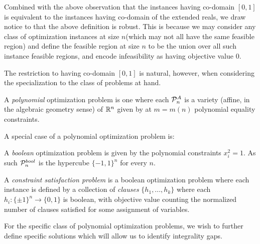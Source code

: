 \documentclass[runningheads,a4paper,english]{llncs}[2022/01/12]
\begin{document}
Combined with the above observation that the instances having co-domain $[0,1]$ is equivalent to the instances having co-domain of the extended reals, we draw notice to that the above definition is robust.
This is because we may consider any class of optimization instances at size $n$(which may not all have the same feasible region) and define the feasible region at size $n$ to be the union over all such instance feasible regions, and encode infeasibility as having objective value $0$.

The restriction to having co-domain $[0,1]$ is natural, however, when considering the specialization to the class of problems at hand.

\begin{definition}
  A \emph{polynomial} optimization problem is one where each $\mathcal{P}_n^A$ is a variety (affine, in the algebraic geometry sense) of $\mathbb{R}^n$ given by at $m = m(n)$ polynomial equality constraints.
\end{definition}
A special case of a polynomial optimization problem is:
\begin{definition}
  A \emph{boolean} optimization problem is given by the polynomial constraints $x_i^2 = 1$. As such $\mathcal{P}_n^{bool}$ is the hypercube $\{-1,1\}^n$ for every $n$.
\end{definition}
\begin{definition}
  A \emph{constraint satisfaction problem} is a boolean optimization problem where each instance is defined by a collection of \emph{clauses} $\{h_1, ..., h_k\}$ where each $h_i : \{\pm 1\}^n \to \{0,1\}$ is boolean, with objective value counting the normalized number of clauses satisfied for some assignment of variables.
\end{definition}

For the specific class of polynomial optimization problems, we wish to further define specific solutions which will allow us to identify integrality gaps.
\end{document}
